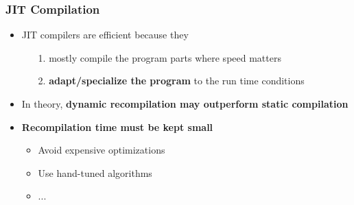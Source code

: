 \begin{frame}
\frametitle{\bf JIT Compilation}

  \begin{itemize}

  \item JIT compilers are efficient because they
    \begin{itemize}
      \item[1.] mostly compile the program parts where speed matters
      \item[2.] {\bf adapt/specialize the program} to the run time conditions
    \end{itemize}
    \smallskip

  \item In theory, {\bf dynamic recompilation may outperform static compilation}
    \smallskip

  \item {\bf Recompilation time must be kept small}
    \begin{itemize}
    \item Avoid expensive optimizations
    \item Use hand-tuned algorithms
    \item ...
    \end{itemize}
    \smallskip

  \end{itemize}
\end{frame}

